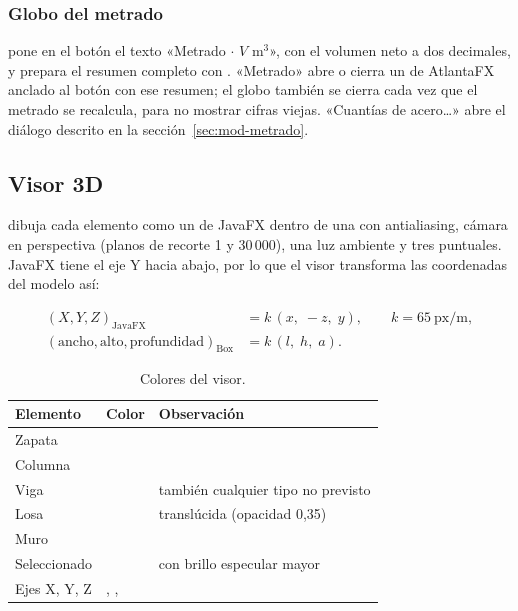 \subsubsection{Globo del metrado}

 pone en el botón el texto «Metrado $\cdot$ $V$ m$^3$», con el volumen neto a dos
decimales, y prepara el resumen completo con . «Metrado» abre o cierra un
 de AtlantaFX anclado al botón con ese resumen; el globo también se cierra cada vez que el metrado se
recalcula, para no mostrar cifras viejas.
«Cuantías de acero\dots» abre el diálogo descrito en la sección~\ref{sec:mod-metrado}.

\subsection{Visor 3D}
\label{sec:mod-visor}

 dibuja cada elemento como un  de JavaFX dentro de una  con
antialiasing, cámara en perspectiva (planos de recorte 1 y 30\,000), una luz ambiente y tres puntuales. JavaFX tiene el
eje Y hacia abajo, por lo que el visor transforma las coordenadas del modelo así:

\begin{align}
	(X, Y, Z)_{\text{JavaFX}} &= k \, (x,\; -z,\; y), \qquad k = 65\ \text{px/m}, \\
	(\text{ancho}, \text{alto}, \text{profundidad})_{\text{Box}} &= k\,(l,\; h,\; a).
\end{align}

\begin{table}[H]
	\centering
	\caption{Colores del visor.}
	\label{tab:mod-colores}
	\begin{tabular}{L{4cm}L{3.2cm}L{6.4cm}}
		\hline
		\textbf{Elemento} & \textbf{Color} & \textbf{Observación} \\ \hline
		Zapata &  & \\
		Columna &  & \\
		Viga &  & también cualquier tipo no previsto \\
		Losa &  & translúcida (opacidad 0,35) \\
		Muro &  & \\
		Seleccionado &  & con brillo especular mayor \\
		Ejes X, Y, Z & , ,  & \\
		\hline
	\end{tabular}
\end{table}

